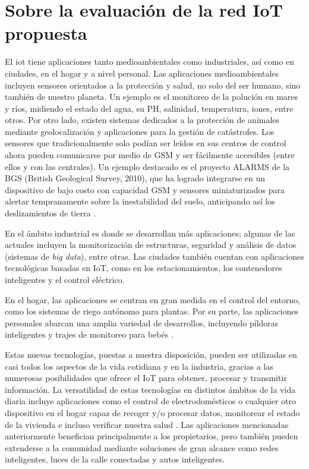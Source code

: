 \section{Sobre la evaluación de la red IoT propuesta}

El \gls{iot} tiene aplicaciones tanto medioambientales como industriales, así como en ciudades, en el hogar y a nivel personal. Las aplicaciones medioambientales incluyen sensores orientados a la protección y salud, no solo del ser humano, sino también de nuestro planeta. Un ejemplo es el monitoreo de la polución en mares y ríos, midiendo el estado del agua, su PH, salinidad, temperatura, iones, entre otros. Por otro lado, existen sistemas dedicados a la protección de animales mediante geolocalización y aplicaciones para la gestión de catástrofes. Los sensores que tradicionalmente solo podían ser leídos en sus centros de control ahora pueden comunicarse por medio de GSM y ser fácilmente accesibles (entre ellos y con las centrales). Un ejemplo destacado es el proyecto ALARMS de la BGS (British Geological Survey, 2010), que ha logrado integrarse en un dispositivo de bajo costo con capacidad GSM y sensores miniaturizados para alertar tempranamente sobre la inestabilidad del suelo, anticipando así los deslizamientos de tierra \cite{Valle2014}.

En el ámbito industrial es donde se desarrollan más aplicaciones; algunas de las actuales incluyen la monitorización de estructuras, seguridad y análisis de datos (sistemas de \emph{big data}), entre otras. Las ciudades también cuentan con aplicaciones tecnológicas basadas en IoT, como en los estacionamientos, los contenedores inteligentes y el control eléctrico.

En el hogar, las aplicaciones se centran en gran medida en el control del entorno, como los sistemas de riego autónomo para plantas. Por su parte, las aplicaciones personales abarcan una amplia variedad de desarrollos, incluyendo píldoras inteligentes y trajes de monitoreo para bebés \cite{Valle2014}.

Estas nuevas tecnologías, puestas a nuestra disposición, pueden ser utilizadas en casi todos los aspectos de la vida cotidiana y en la industria, gracias a las numerosas posibilidades que ofrece el IoT para obtener, procesar y transmitir información. La versatilidad de estas tecnologías en distintos ámbitos de la vida diaria incluye aplicaciones como el control de electrodomésticos o cualquier otro dispositivo en el hogar capaz de recoger y/o procesar datos, monitorear el estado de la vivienda e incluso verificar nuestra salud \cite{Alcaraz2014InternetCosas}. Las aplicaciones mencionadas anteriormente benefician principalmente a los propietarios, pero también pueden extenderse a la comunidad mediante soluciones de gran alcance como redes inteligentes, luces de la calle conectadas y autos inteligentes.

